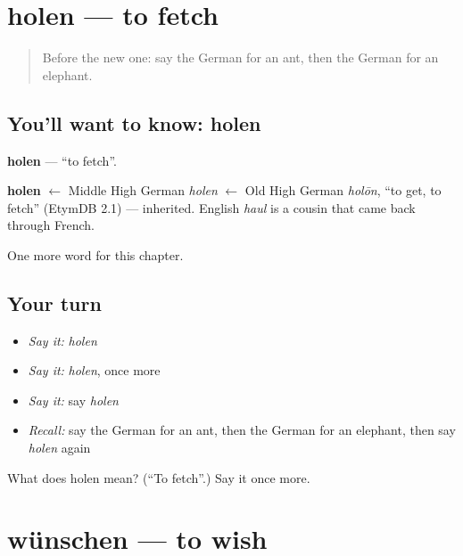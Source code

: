\section[holen]{holen — to fetch}

\label{lesson:GE-C88-holen}



\begin{quote}
Before the new one: say the German for an ant, then the German for an elephant.
\end{quote}

\subsection*{You'll want to know: holen}
\textbf{holen} — \textquotedblleft{}to fetch\textquotedblright{}.

\begin{cousinweb}
\textbf{holen} $\leftarrow$ Middle High German \emph{holen} $\leftarrow$ Old High German \emph{holōn}, \textquotedblleft{}to get, to fetch\textquotedblright{} (EtymDB 2.1) — inherited. English \emph{haul} is a cousin that came back through French.
\end{cousinweb}

\begin{grammarlens}[title={What you've built}]
One more word for this chapter.
\end{grammarlens}

\subsection*{Your turn}
\begin{itemize}
\raggedright
  \item \emph{Say it:} \emph{holen}
  \item \emph{Say it:} \emph{holen}, once more
  \item \emph{Say it:} say \emph{holen}
  \item \emph{Recall:} say the German for an ant, then the German for an elephant, then say \emph{holen} again
\end{itemize}

\begin{tcolorbox}[breakable,colback=teal!4,colframe=teal!35!black,title={Before you move on}]
What does holen mean? (\textquotedblleft{}To fetch\textquotedblright{}.) Say it once more.
\end{tcolorbox}
\section[wünschen]{wünschen — to wish}

